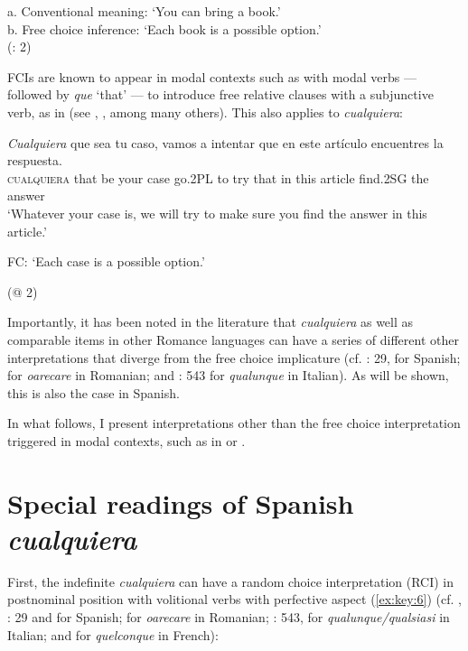     a.  Conventional meaning: ‘You can bring a book.’\\
    b.  Free choice inference: ‘Each book is a possible option.’\\
      (\citealt{AloniEtAl2011}: 2)
\z

FCIs are known to appear in modal contexts such as with modal verbs — followed by \textit{que} ‘that’ — to introduce free relative clauses with a subjunctive verb, as in  (see \citealt{Quer2000}, \citealt{Giannakidou2001}, among many others). This also applies to \textit{cualquiera}:

\ea \label{ex:key:5}
   \gll \textit{Cualquiera} que sea tu caso, vamos a intentar que en este artículo encuentres la respuesta.\\
    \textsc{cualquiera} that be your case go.\textsc{2PL} to try that in this article find.\textsc{2SG} the answer\\
    \glt ‘Whatever your case is, we will try to make sure you find the answer in this article.’

    FC: ‘Each case is a possible option.’

      (@ 2)
\z

Importantly, it has been noted in the literature that \textit{cualquiera} as well as comparable items in other Romance languages can have a series of different other interpretations that diverge from the free choice implicature (cf. \citealt{Alonso-OvalleMenéndez-Benito2011}: 29, \citealt{Rivero2011} for Spanish; \citealt{Fălăuş2015} for \textit{oarecare} in Romanian; and \citealt{Chierchia2006}: 543 for \textit{qualunque} in Italian). As will be shown, this is also the case in Spanish.

  In what follows, I present interpretations other than the free choice interpretation triggered in modal contexts, such as in  or .

\section{Special readings of Spanish \textit{cualquiera}} \label{sec:1.3}

First, the indefinite \textit{cualquiera} can have a random choice interpretation (RCI) in postnominal position with volitional verbs with perfective aspect (\ref{ex:key:6}) (cf. \citealt{ChoiRomero2008}, \citealt{Alonso-OvalleMenéndez-Benito2011}: 29 and \citealt{Rivero2011} for Spanish; \citealt{Fălăuş2015} for \textit{oarecare} in Romanian; \citealt{Chierchia2006}: 543, \citealt{Kellert2021a} for \textit{qualunque/qualsiasi} in Italian; and \citealt{Vlachou2007,Vlachou2012} for \textit{quelconque} in French):

